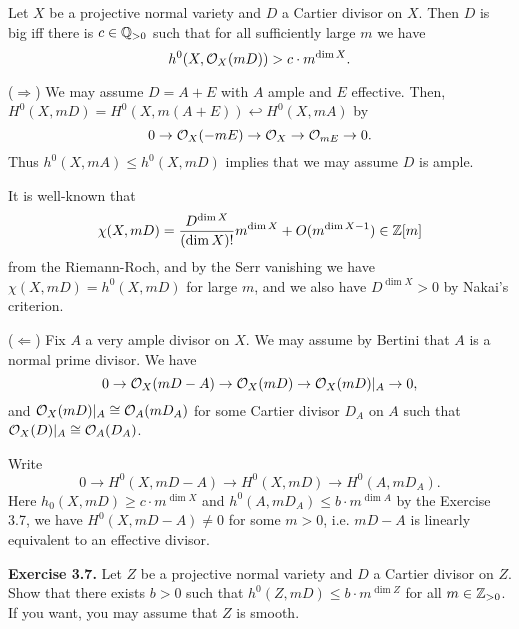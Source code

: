 \documentclass{../../small}
\begin{document}
\begin{prop}
Let $X$ be a projective normal variety and $D$ a Cartier divisor on $X$.
Then $D$ is big iff there is $c\in\mathbb{Q}_{>0}$ such that for all sufficiently large $m$ we have
\[h^0(X,\mathcal{O}_X(mD))>c\cdot m^{\dim X}.\]
\end{prop}
\begin{pf}
($\Rightarrow$)
We may assume $D=A+E$ with $A$ ample and $E$ effective.
Then, $H^0(X,mD)=H^0(X,m(A+E))\hookleftarrow H^0(X,mA)$ by
\[0\to \mathcal{O}_X(-mE)\to\mathcal{O}_X\to\mathcal{O}_{mE}\to0.\]
Thus $h^0(X,mA)\le h^0(X,mD)$ implies that we may assume $D$ is ample.

It is well-known that
\[\chi(X,mD)=\frac{D^{\dim X}}{(\dim X)!}m^{\dim X}+O(m^{\dim X-1})\in\mathbb{Z}[m]\]
from the Riemann-Roch, and by the Serr vanishing we have $\chi(X,mD)=h^0(X,mD)$ for large $m$, and we also have $D^{\dim X}>0$ by Nakai's criterion.

($\Leftarrow$)
Fix $A$ a very ample divisor on $X$.
We may assume by Bertini that $A$ is a normal prime divisor.
We have
\[0\to\mathcal{O}_X(mD-A)\to\mathcal{O}_X(mD)\to\mathcal{O}_X(mD)|_A\to0,\]
and $\mathcal{O}_X(mD)|_A\cong\mathcal{O}_A(mD_A)$ for some Cartier divisor $D_A$ on $A$ such that $\mathcal{O}_X(D)|_A\cong \mathcal{O}_A(D_A)$.

Write
\[0\to H^0(X,mD-A)\to H^0(X,mD)\to H^0(A,mD_A).\]
Here $h_0(X,mD)\ge c\cdot m^{\dim X}$ and $h^0(A,mD_A)\le b\cdot m^{\dim A}$ by the Exercise 3.7, we have $H^0(X,mD-A)\ne0$ for some $m>0$, i.e. $mD-A$ is linearly equivalent to an effective divisor.
\end{pf}

\textbf{Exercise 3.7.} Let $Z$ be a projective normal variety and $D$ a Cartier divisor on $Z$.
Show that there exists $b>0$ such that $h^0(Z,mD)\le b\cdot m^{\dim Z}$ for all $m\in\mathbb{Z}_{>0}$.
If you want, you may assume that $Z$ is smooth.
\end{document}

